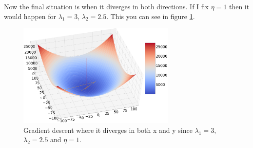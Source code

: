\documentclass[a4paper]{article}
\begin{document}
Now the final situation is when it diverges in both directions. If I fix $\eta = 1$ then it would happen for $\lambda_1 =3$, $ \lambda_2 = 2.5$. This you can see in figure \ref{BothDiverge}. 

\begin{figure}[H]
\includegraphics[width=0.7\textwidth]{Images/BothDiverge}
\caption{Gradient descent where it diverges in both x and y since $\lambda_1 = 3$, $\lambda_2 = 2.5$ and $\eta = 1$.}
\label{BothDiverge}
\end{figure} 
\end{document}
